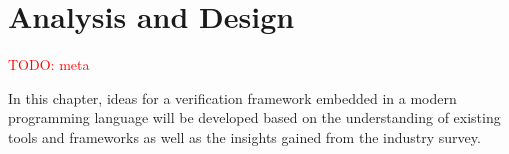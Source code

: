 \documentclass[11pt,a4paper]{report}
\newcommand{\todo}[1]{\textcolor{red}{TODO: #1}}
\begin{document}
\chapter{Analysis and Design}

\todo{meta}

In this chapter, ideas for a verification framework embedded in a modern programming language will be developed based
on the understanding of existing tools and frameworks as well as the insights gained from the industry survey.

\end{document}
